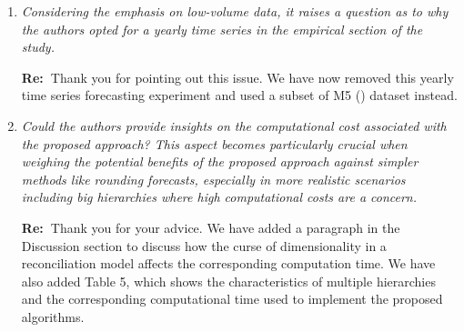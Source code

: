 \documentclass[11pt,a4paper]{article}
\newcommand{\RE}[2][Re:~]{{\color{blue}\textbf{#1}#2}}
\begin{document}
\begin{enumerate}
  \item \textit{Considering the emphasis on low-volume data, it raises a question as to why the authors opted for a yearly time series in the empirical section of the study.}
 
  \RE{Thank you for pointing out this issue. We have now removed this yearly time series forecasting experiment and used a subset of M5 (\citealp{makridakisM5AccuracyCompetition2022}) dataset instead.}
  
  \item \textit{Could the authors provide insights on the computational cost associated with the proposed approach? This aspect becomes particularly crucial when weighing the potential benefits of the proposed approach against simpler methods like rounding forecasts, especially in more realistic scenarios including big hierarchies where high computational costs are a concern.}
  
  \RE{Thank you for your advice. We have added a paragraph in the Discussion section to discuss how the curse of dimensionality in a reconciliation model affects the corresponding computation time. We have also added Table 5, which shows the characteristics of multiple hierarchies and the corresponding computational time used to implement the proposed algorithms.}


\end{enumerate}

% 
% 
\printbibliography
\end{document}
